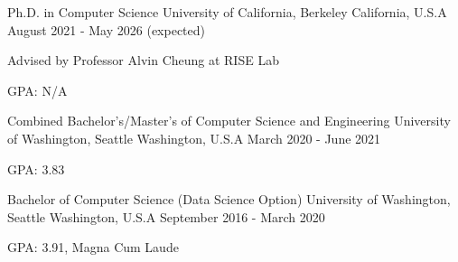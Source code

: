 

\begin{cventries}

  \cventry
    {Ph.D. in Computer Science} %
    {University of California, Berkeley} %
    {California, U.S.A} %
    {August 2021 - May 2026 (expected)} %
    {
      \begin{cvitems} %
        \item {Advised by Professor Alvin Cheung at RISE Lab}
        \item {GPA: N/A}
      \end{cvitems}
    }
    
  \cventry
    {Combined Bachelor's/Master's of Computer Science and Engineering} %
    {University of Washington, Seattle} %
    {Washington, U.S.A} %
    {March 2020 - June 2021} %
    {
      \begin{cvitems} %
        \item {GPA: 3.83}
      \end{cvitems}
    }

  \cventry
    {Bachelor of Computer Science (Data Science Option)} %
    {University of Washington, Seattle} %
    {Washington, U.S.A} %
    {September 2016 - March 2020} %
    {
      \begin{cvitems} %
        \item {GPA: 3.91, Magna Cum Laude}
      \end{cvitems}
    }

\end{cventries}
